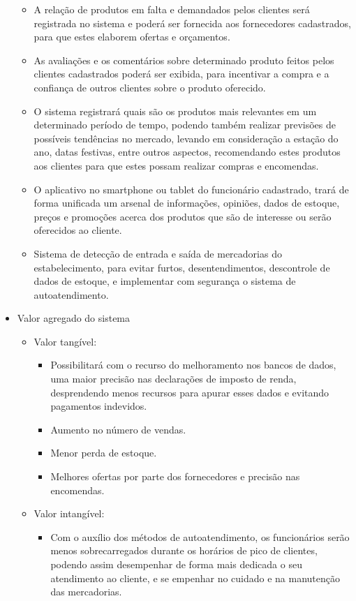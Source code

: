\begin{itemize}
\begin{itemize}
	\item A relação de produtos em falta e demandados pelos clientes será registrada no sistema e poderá ser fornecida aos fornecedores cadastrados, para que estes elaborem ofertas e orçamentos.
	\item As avaliações e os comentários sobre determinado produto feitos pelos clientes cadastrados poderá ser exibida, para incentivar a compra e a confiança de outros clientes sobre o produto oferecido.
	\item O sistema registrará quais são os produtos mais relevantes em um determinado período de tempo, podendo também realizar previsões de possíveis tendências no mercado, levando em consideração a estação do ano, datas festivas, entre outros aspectos, recomendando estes produtos aos clientes para que estes possam realizar compras e encomendas.
	\item O aplicativo no smartphone ou tablet do funcionário cadastrado, trará de forma unificada um arsenal de informações, opiniões, dados de estoque, preços e promoções acerca dos produtos que são de interesse ou serão oferecidos ao cliente.
	\item Sistema de detecção de entrada e saída de mercadorias do estabelecimento, para evitar furtos, desentendimentos, descontrole de dados de estoque, e implementar com segurança o sistema de autoatendimento.
	\end{itemize}
\item Valor agregado do sistema
	\begin{itemize}
	\item Valor tangível:
		\begin{itemize}
		\item Possibilitará com o recurso do melhoramento nos bancos de dados, uma maior precisão nas declarações de imposto 		de renda, desprendendo menos recursos para apurar esses dados e evitando pagamentos indevidos.
		\item Aumento no número de vendas. 
		\item Menor perda de estoque.
		\item Melhores ofertas por parte dos fornecedores e precisão nas encomendas.
		\end{itemize}
	\item Valor intangível:
		\begin{itemize}
		\item Com o auxílio dos métodos de autoatendimento, os funcionários serão menos sobrecarregados durante os horários		de pico de clientes, podendo assim desempenhar de forma mais dedicada o seu atendimento ao cliente, e se empenhar no			cuidado e na manutenção das mercadorias.

\end{itemize}
\end{itemize}
\end{itemize}

